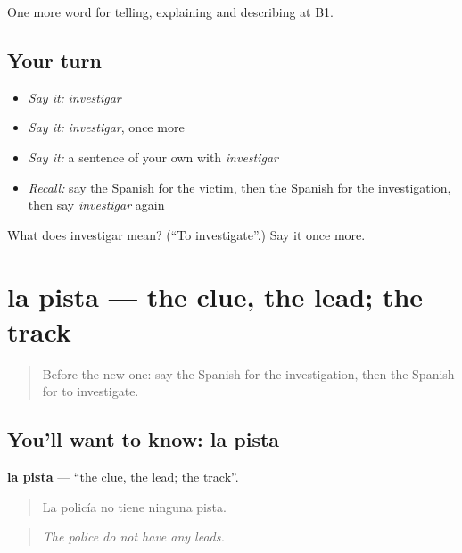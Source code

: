 \begin{grammarlens}[title={What you've built}]
One more word for telling, explaining and describing at B1.
\end{grammarlens}

\subsection*{Your turn}
\begin{itemize}
\raggedright
  \item \emph{Say it:} \emph{investigar}
  \item \emph{Say it:} \emph{investigar}, once more
  \item \emph{Say it:} a sentence of your own with \emph{investigar}
  \item \emph{Recall:} say the Spanish for the victim, then the Spanish for the investigation, then say \emph{investigar} again
\end{itemize}

\begin{tcolorbox}[breakable,colback=teal!4,colframe=teal!35!black,title={Before you move on}]
What does investigar mean? (\textquotedblleft{}To investigate\textquotedblright{}.) Say it once more.
\end{tcolorbox}
\section[la pista]{la pista — the clue, the lead; the track}

\label{lesson:ES-C521-pista}



\begin{quote}
Before the new one: say the Spanish for the investigation, then the Spanish for to investigate.
\end{quote}

\subsection*{You'll want to know: la pista}
\textbf{la pista} — \textquotedblleft{}the clue, the lead; the track\textquotedblright{}.

\begin{quote}
La policía no tiene ninguna pista.
\end{quote}

\begin{quote}
\emph{The police do not have any leads.}
\end{quote}

